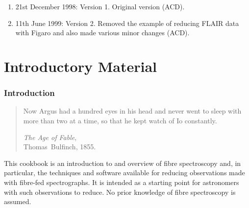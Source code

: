 \documentclass[chapters,twoside,11pt]{starlink}
\begin{document}
\scfrontmatter



\begin{enumerate}

   \item 21st December 1998: Version 1. Original version (ACD).

   \item 11th June 1999: Version 2.  Removed the example of reducing
   FLAIR data with Figaro and also made various minor changes (ACD).

\end{enumerate}

\cleardoublepage
\newpage

\part{Introductory Material}
\section{\label{INTRO}Introduction}

\begin{quote}
Now Argus had a hundred eyes in his head and never went to sleep with
more than two at a time, so that he kept watch of Io constantly.

\emph{The Age of Fable},    \raggedleft \\
Thomas~Bulfinch, 1855.     \raggedleft

\end{quote}

This cookbook is an introduction to and overview of fibre spectroscopy
and, in particular, the techniques and software available for reducing
observations made with fibre-fed spectrographs.  It is intended as a
starting point for astronomers with such observations to reduce.  No prior
knowledge of fibre spectroscopy is assumed.
\end{document}
